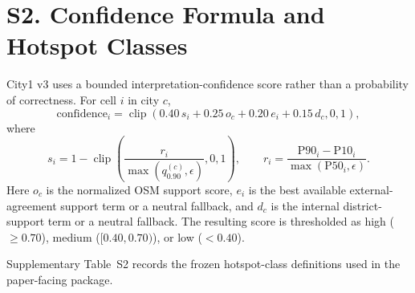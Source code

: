 \section{S2. Confidence Formula and Hotspot Classes}

City1 v3 uses a bounded interpretation-confidence score rather than a probability of correctness. For cell $i$ in city $c$,
\[
\mathrm{confidence}_i =
\operatorname{clip}\!\left(
0.40\,s_i +
0.25\,o_c +
0.20\,e_i +
0.15\,d_c, 0, 1
\right),
\]
where
\[
s_i = 1 - \operatorname{clip}\!\left(
\frac{r_i}{\max(q_{0.90}^{(c)},\epsilon)}, 0, 1
\right),
\qquad
r_i = \frac{\mathrm{P90}_i - \mathrm{P10}_i}{\max(\mathrm{P50}_i,\epsilon)}.
\]
Here $o_c$ is the normalized OSM support score, $e_i$ is the best available external-agreement support term or a neutral fallback, and $d_c$ is the internal district-support term or a neutral fallback. The resulting score is thresholded as high ($\geq 0.70$), medium ($[0.40,0.70)$), or low ($< 0.40$).

Supplementary Table~S2 records the frozen hotspot-class definitions used in the paper-facing package.



